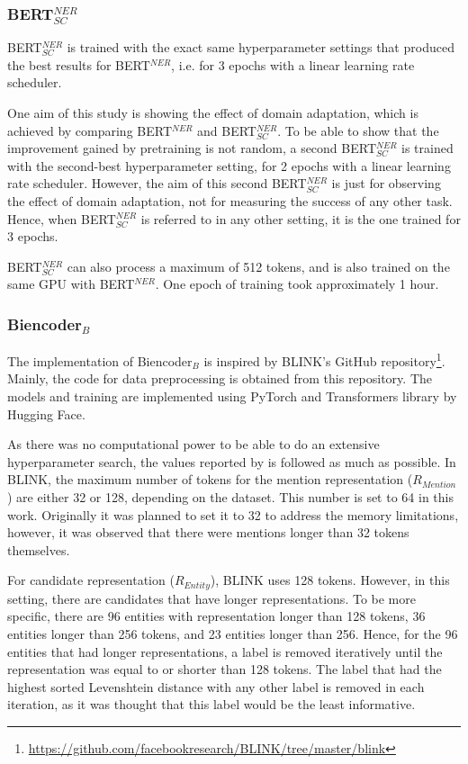 \documentclass{report}
\theoremstyle{definition}
\theoremstyle{remark}
\begin{document}
\subsubsection{BERT$^{NER}_{SC}$}
BERT$^{NER}_{SC}$ is trained with the exact same hyperparameter settings that produced the best results for BERT$^{NER}$, i.e. for 3 epochs with a linear learning rate scheduler.

One aim of this study is showing the effect of domain adaptation, which is achieved by comparing BERT$^{NER}$ and BERT$^{NER}_{SC}$. To be able to show that the improvement gained by pretraining is not random, a second BERT$^{NER}_{SC}$ is trained with the second-best hyperparameter setting, for 2 epochs with a linear learning rate scheduler. However, the aim of this second BERT$^{NER}_{SC}$ is just for observing the effect of domain adaptation, not for measuring the success of any other task. Hence, when BERT$^{NER}_{SC}$ is referred to in any other setting, it is the one trained for 3 epochs.

BERT$^{NER}_{SC}$ can also process a maximum of 512 tokens, and is also trained on the same GPU with BERT$^{NER}$. One epoch of training took approximately 1 hour.
\subsubsection{Biencoder$_{B}$}
The implementation of Biencoder$_{B}$ is inspired by BLINK's GitHub repository\footnote{\url{https://github.com/facebookresearch/BLINK/tree/master/blink}}. Mainly, the code for data preprocessing is obtained from this repository. The models and training are implemented using PyTorch \cite{pytorch} and Transformers library by Hugging Face.

As there was no computational power to be able to do an extensive hyperparameter search, the values reported by \cite{scalablezeroshot} is followed as much as possible. In BLINK, the maximum number of tokens for the mention representation ($R_{Mention}$) are either 32 or 128, depending on the dataset. This number is set to 64 in this work. Originally it was planned to set it to 32 to address the memory limitations, however, it was observed that there were mentions longer than 32 tokens themselves.

For candidate representation ($R_{Entity}$), BLINK uses 128 tokens. However, in this setting, there are candidates that have longer representations. To be more specific, there are 96 entities with representation longer than 128 tokens, 36 entities longer than 256 tokens, and 23 entities longer than 256. Hence, for the 96 entities that had longer representations, a label is removed iteratively until the representation was equal to or shorter than 128 tokens. The label that had the highest sorted Levenshtein distance with any other label is removed in each iteration, as it was thought that this label would be the least informative.
\end{document}
